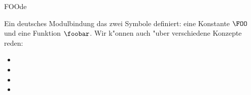 \begin{mhmodnl}{FOO}{de}
  \begin{definition}
    Ein deutsches Modulbindung das zwei Symbole definiert: eine Konstante $\FOO$ und eine
    Funktion $\foobar$. Wir k"onnen auch "uber verschiedene Konzepte reden:
    \begin{itemize}
    \item   {}
    \item   {}
    \item   {}
    \item   {}
    \end{itemize}
  \end{definition}
\end{mhmodnl}

